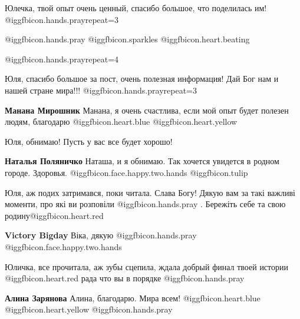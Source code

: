  
 
 
 
 
\zzSecCmt

\begin{itemize} %

Юлечка, твой опыт очень ценный, спасибо большое, что поделилась им!  @igg{fbicon.hands.pray}{repeat=3} 

 @igg{fbicon.hands.pray}  @igg{fbicon.sparkles}  @igg{fbicon.heart.beating} 

 @igg{fbicon.hands.pray}{repeat=4} 


Юля, спасибо большое за пост, очень полезная информация! Дай Бог нам и нашей
стране мира!!! @igg{fbicon.hands.pray}{repeat=3} 

\textbf{Манана Мирошник} Манана, я очень счастлива, если мой опыт будет полезен людям, благодарю @igg{fbicon.heart.blue}  @igg{fbicon.heart.yellow} 

Юля, обнимаю!
Пусть у вас все будет хорошо!

\textbf{Наталья Поляничко} Наташа, и я обнимаю. Так хочется увидется в родном городе. Здоровья. @igg{fbicon.face.happy.two.hands}  @igg{fbicon.tulip} 


Юля, аж подих затримався, поки читала. Слава Богу! Дякую вам за такі важливі
моменти, про які ви розповіли @igg{fbicon.hands.pray} . Бережіть себе та свою родину@igg{fbicon.heart.red}

\textbf{Victory Bigday} Віка, дякую @igg{fbicon.hands.pray}  @igg{fbicon.face.happy.two.hands} 

Юличка, все прочитала, аж зубы сцепила, ждала добрый финал твоей истории
@igg{fbicon.heart.red} рада что вы в порядке  @igg{fbicon.hands.pray}

\textbf{Алина Зарянова} Алина, благодарю.
Мира всем! @igg{fbicon.heart.blue}  @igg{fbicon.heart.yellow}  @igg{fbicon.hands.pray} 


\end{itemize}
